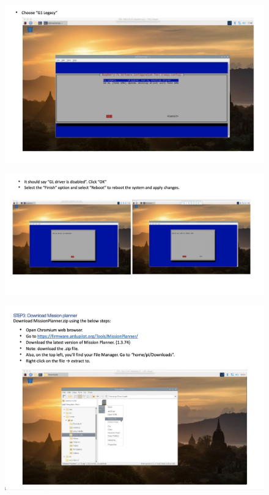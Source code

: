 \begin{figure}[h!]
\centering
\includegraphics[width=\columnwidth]{./Figures/config_img10.png}
\end{figure}

\begin{figure}[h!]
\centering
\includegraphics[width=\columnwidth]{./Figures/config_img11.png}
\end{figure}

\begin{figure}[h!]
\centering
\includegraphics[width=\columnwidth]{./Figures/config_img12.png}
\end{figure}

